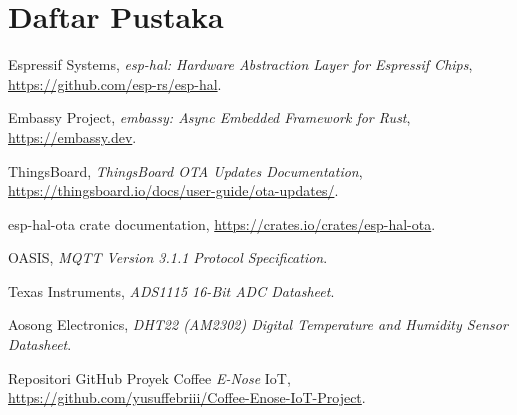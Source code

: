 \documentclass[12pt,a4paper]{report}
\begin{document}
\chapter*{Daftar Pustaka}

\begin{enumerate}[label={[\arabic*]}]
    \item Espressif Systems, \textit{esp-hal: Hardware Abstraction Layer for
    Espressif Chips}, \url{https://github.com/esp-rs/esp-hal}.
    \item Embassy Project, \textit{embassy: Async Embedded Framework for Rust},
    \url{https://embassy.dev}.
    \item ThingsBoard, \textit{ThingsBoard OTA Updates Documentation},
    \url{https://thingsboard.io/docs/user-guide/ota-updates/}.
    \item esp-hal-ota crate documentation, \url{https://crates.io/crates/esp-hal-ota}.
    \item OASIS, \textit{MQTT Version 3.1.1 Protocol Specification}.
    \item Texas Instruments, \textit{ADS1115 16-Bit ADC Datasheet}.
    \item Aosong Electronics, \textit{DHT22 (AM2302) Digital Temperature and
    Humidity Sensor Datasheet}.
    \item Repositori GitHub Proyek Coffee \textit{E-Nose} IoT, \url{https://github.com/yusuffebriii/Coffee-Enose-IoT-Project}.
\end{enumerate}
\end{document}
